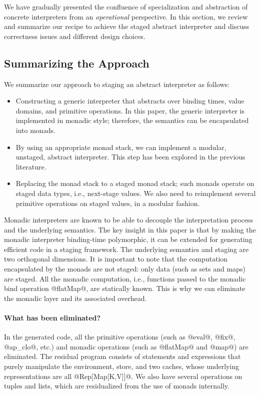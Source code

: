 We have gradually presented the confluence of specialization and abstraction of
concrete interpreters from an \textit{operational} perspective.
In this section, we review and summarize our recipe to achieve the staged
abstract interpreter and discuss correctness issues and different design choices.

\subsection{Summarizing the Approach}

We summarize our approach to staging an abstract interpreter as follows:

\begin{itemize}
  \item Constructing a generic interpreter that abstracts over binding times,
    value domains, and primitive operations. In this paper, the generic interpreter
    is implemented in monadic style; therefore, the semantics can be encapsulated
    into monads.
  \item By using an appropriate monad stack, we can implement a modular, unstaged,
    abstract interpreter. This step has been explored in the previous literature.
  \item Replacing the monad stack to a staged monad stack; such monads operate on
    staged data types, i.e., next-stage values. We also need to reimplement several
    primitive operations on staged values, in a modular fashion.
\end{itemize}

Monadic interpreters are known to be able to decouple the interpretation process
and the underlying semantics. The key insight in this paper is that by making the
monadic interpreter binding-time polymorphic, it can be extended for generating
efficient code in a staging framework. The underlying semantics and staging are
two orthogonal dimensions. It is important to note that the computation
encapsulated by the monads are not staged: only data (such as sets and maps) are
staged. All the monadic computation, i.e., functions passed to the monadic bind
operation @flatMap@, are statically known. This is why we can eliminate the
monadic layer and its associated overhead.

\paragraph{What has been eliminated?} In the generated code, all the
primitive operations (such as @eval@, @fix@, @ap_clo@, etc.) and monadic
operations (such as @flatMap@ and @map@) are eliminated. The residual program
consists of statements and expressions that purely manipulate the environment,
store, and two caches, whose underlying representations are all @Rep[Map[K,V]]@. We
also have several operations on tuples and lists, which are residualized from
the use of monads internally.

